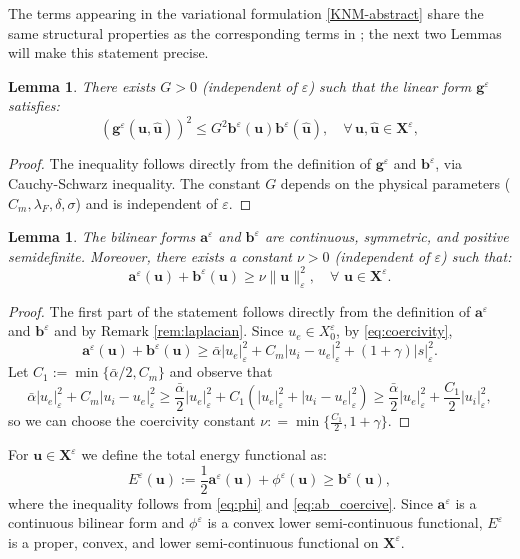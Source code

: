 \documentclass[a4paper,11pt]{article}
\newtheorem{lemma}[theorem]{Lemma}
\theoremstyle{definition}
\numberwithin{equation}{section}
\newcommand{\e}{\varepsilon}
\begin{document}
The terms appearing in the variational formulation \eqref{KNM-abstract} share the same structural properties as the corresponding terms in \cite{CFS02,PSCF05}; the next two Lemmas will make this statement precise.
\begin{lemma}
	\label{lemma:g}
	There exists $G>0$ (independent of $\e$) such that the linear  form $\mathbf{g}^\e$ satisfies:
	\begin{equation*}
		(\mathbf{g}^\e(\mathbf{u}, \widehat{\mathbf{u}}))^2 \leq G^2 \mathbf{b}^\e(\mathbf{u}) \mathbf{b}^\e(\widehat{\mathbf{u}}), \quad \forall\, \mathbf{u}, \widehat{\mathbf{u}} \in \mathbf{X}^\e,
	\end{equation*}
\end{lemma}
\begin{proof}
	The inequality follows directly from the definition of $\mathbf{g}^\e$ and $\mathbf{b}^\e$, via Cauchy-Schwarz inequality. The constant $G$ depends on the physical parameters ($C_m, \lambda_F, \delta, \sigma$) and is independent of $\e$. %
\end{proof}
\begin{lemma} 
	\label{lemma:coercive}
	The bilinear forms $\mathbf{a}^\e$ and $\mathbf{b}^\e$ are continuous, symmetric, and positive semidefinite. Moreover, there exists a constant $\nu > 0$ (independent of $\e$) such that:
	\begin{equation}
		\label{eq:ab_coercive}
		\mathbf{a}^\e(\mathbf{u}) + \mathbf{b}^\e(\mathbf{u}) \geq \nu \|\mathbf{u}\|^2_{\e}, \quad \forall \,\,\mathbf{u} \in \mathbf{X}^\e.
	\end{equation}
\end{lemma}
\begin{proof}  
	The first part of the statement follows directly from the definition of $\mathbf{a}^\e$ and $\mathbf{b}^\e$ and by Remark \ref{rem:laplacian}. Since $u_e \in X_0^\e$, by \eqref{eq:coercivity},
	\[	
	\mathbf{a}^\e(\mathbf{u}) + \mathbf{b}^\e(\mathbf{u}) 
	\geq \bar\alpha |u_e|_\e^2 + C_m |u_i - u_e|_\e^2 + (1+\gamma) |s|_\e^2.
	\]
	Let $C_1 := \min \{ \bar \alpha/2, C_m \}$ and observe that
	\[
	\bar\alpha |u_e|_\e^2 + C_m |u_i - u_e|_\e^2 
	\geq \frac{\bar\alpha}{2} |u_e|_\e^2 + C_1\left(|u_e|_\e^2 + |u_i - u_e|_\e^2 \right)
	\geq \frac{\bar\alpha}{2} |u_e|_\e^2 + \frac{C_1}{2} |u_i|_\e^2,
	\]
	so we can choose the coercivity constant $\nu: = \min \{ \frac{C_1}{2}, 1+\gamma \}$.
\end{proof}
For $\mathbf{u}\in \mathbf{X}^\e$ we define the total energy functional as:
\begin{equation}
	\label{eq:energy}
	E^\e(\mathbf{u}) := \dfrac{1}{2} \mathbf{a}^\e(\mathbf{u}) 
	+ \phi^\e(\mathbf{u}) \geq \mathbf{b}^\e(\mathbf{u}),
\end{equation}
where the inequality follows from \eqref{eq:phi} and \eqref{eq:ab_coercive}. %
Since $\mathbf{a}^\e$ is a continuous bilinear form and $\phi^\e$ is a convex lower semi-continuous functional, $E^\e$ is a proper, convex, and lower semi-continuous functional on $\mathbf{X}^\e$.
\end{document}
